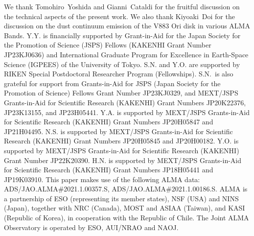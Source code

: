\documentclass[twocolumn, twocolappendix, astrosymb, times]{aastex631}
\begin{document}
\begin{acknowledgments}
We thank Tomohiro~Yoshida and Gianni~Cataldi for the fruitful discussion on the technical aspects of the present work. We also thank Kiyoaki~Doi for the discussion on the dust continuum emission of the V883 Ori disk in various ALMA Bands. 
Y.Y. is financially supported by Grant-in-Aid for the Japan
Society for the Promotion of Science (JSPS) Fellows (KAKENHI Grant Number JP23KJ0636) and International Graduate Program for Excellence in Earth-Space Science (IGPEES) of the University of Tokyo.
S.N. and Y.O. are supported by RIKEN Special Postdoctoral Researcher Program (Fellowships).
S.N.~is also grateful for support from Grants-in-Aid for JSPS (Japan Society for the Promotion of Science) Fellows Grant Number JP23KJ0329, and MEXT/JSPS Grants-in-Aid for Scientific Research (KAKENHI) Grant Numbers JP20K22376, JP23K13155, and JP23H05441.
Y.A. is supported by MEXT/JSPS Grants-in-Aid for Scientific Research (KAKENHI) Grant Numbers JP20H05847 and JP21H04495.
N.S. is supported by MEXT/JSPS Grants-in-Aid for Scientific Research (KAKENHI) Grant Numbers JP20H05845 and JP20H00182.
Y.O. is supported by MEXT/JSPS Grants-in-Aid for Scientific Research (KAKENHI) Grant Number JP22K20390.
H.N. is supported by MEXT/JSPS Grants-in-Aid for Scientific Research (KAKENHI) Grant Numbers JP18H05441 and JP19K03910.
This paper makes use of the following ALMA data: ADS/JAO.ALMA\#2021.1.00357.S, ADS/JAO.ALMA\#2021.1.00186.S. %
ALMA is a partnership of ESO (representing its member states), NSF (USA) and NINS (Japan), together with NRC (Canada), MOST and ASIAA (Taiwan), and KASI (Republic of Korea), in cooperation with the Republic of Chile. The Joint ALMA Observatory is operated by ESO, AUI/NRAO and NAOJ. 

\end{acknowledgments}

%
\end{document}

